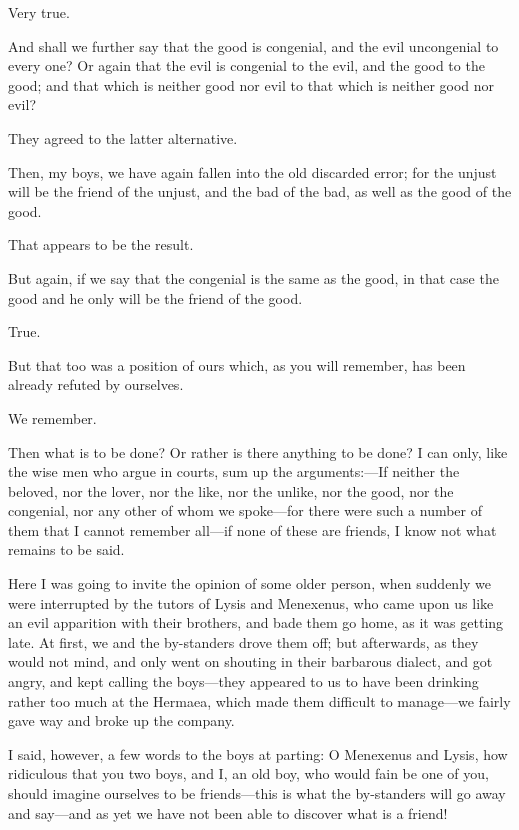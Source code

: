 \documentclass[11pt,letter]{article}
\begin{document}
\par  Very true.

\par  And shall we further say that the good is congenial, and the evil uncongenial to every one? Or again that the evil is congenial to the evil, and the good to the good; and that which is neither good nor evil to that which is neither good nor evil?

\par  They agreed to the latter alternative.

\par  Then, my boys, we have again fallen into the old discarded error; for the unjust will be the friend of the unjust, and the bad of the bad, as well as the good of the good.

\par  That appears to be the result.

\par  But again, if we say that the congenial is the same as the good, in that case the good and he only will be the friend of the good.

\par  True.

\par  But that too was a position of ours which, as you will remember, has been already refuted by ourselves.

\par  We remember.

\par  Then what is to be done? Or rather is there anything to be done? I can only, like the wise men who argue in courts, sum up the arguments:—If neither the beloved, nor the lover, nor the like, nor the unlike, nor the good, nor the congenial, nor any other of whom we spoke—for there were such a number of them that I cannot remember all—if none of these are friends, I know not what remains to be said.

\par  Here I was going to invite the opinion of some older person, when suddenly we were interrupted by the tutors of Lysis and Menexenus, who came upon us like an evil apparition with their brothers, and bade them go home, as it was getting late. At first, we and the by-standers drove them off; but afterwards, as they would not mind, and only went on shouting in their barbarous dialect, and got angry, and kept calling the boys—they appeared to us to have been drinking rather too much at the Hermaea, which made them difficult to manage—we fairly gave way and broke up the company.

\par  I said, however, a few words to the boys at parting: O Menexenus and Lysis, how ridiculous that you two boys, and I, an old boy, who would fain be one of you, should imagine ourselves to be friends—this is what the by-standers will go away and say—and as yet we have not been able to discover what is a friend!

\par 
 
\end{document}
